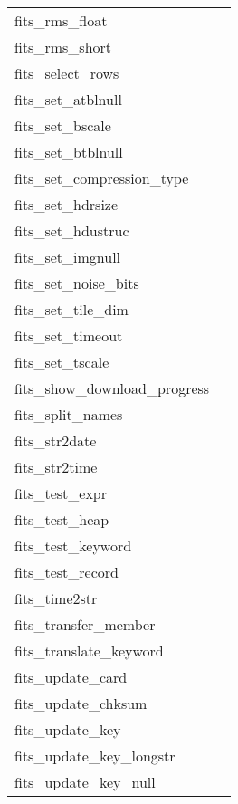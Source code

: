 \documentclass[11pt]{book}
\begin{document}
\begin{tabular}{lr}
fits\_rms\_float      & \pageref{imageRMS} \\
fits\_rms\_short      & \pageref{imageRMS} \\
fits\_select\_rows  & \pageref{ffsrow} \\
fits\_set\_atblnull   & \pageref{ffsnul} \\
fits\_set\_bscale     & \pageref{ffpscl} \\
fits\_set\_btblnull   & \pageref{fftnul} \\
fits\_set\_compression\_type  & \pageref{ffsetcomp} \\
fits\_set\_hdrsize    & \pageref{ffhdef} \\
fits\_set\_hdustruc   & \pageref{ffrdef} \\
fits\_set\_imgnull    & \pageref{ffpnul} \\
fits\_set\_noise\_bits  & \pageref{ffsetcomp} \\
fits\_set\_tile\_dim  & \pageref{ffsetcomp} \\
fits\_set\_timeout    & \pageref{ffgtmo} \\
fits\_set\_tscale     & \pageref{fftscl} \\
fits\_show\_download\_progress  & \pageref{ffshdwn} \\
fits\_split\_names    & \pageref{splitnames} \\
fits\_str2date        & \pageref{ffdt2s} \\
fits\_str2time        & \pageref{ffdt2s} \\
fits\_test\_expr      & \pageref{fftexp} \\
fits\_test\_heap      & \pageref{fftheap} \\
fits\_test\_keyword   & \pageref{fftkey} \\
fits\_test\_record    & \pageref{fftrec} \\
fits\_time2str  & \pageref{ffdt2s} \\
fits\_transfer\_member  & \pageref{ffgmtf} \\
fits\_translate\_keyword & \pageref{translatekey} \\
fits\_update\_card       & \pageref{ffucrd} \\
fits\_update\_chksum  & \pageref{ffupck} \\
fits\_update\_key        & \pageref{ffuky} \\
fits\_update\_key\_longstr   & \pageref{ffukyx} \\
fits\_update\_key\_null   & \pageref{ffukyu} \\

\end{tabular}
\end{document}
